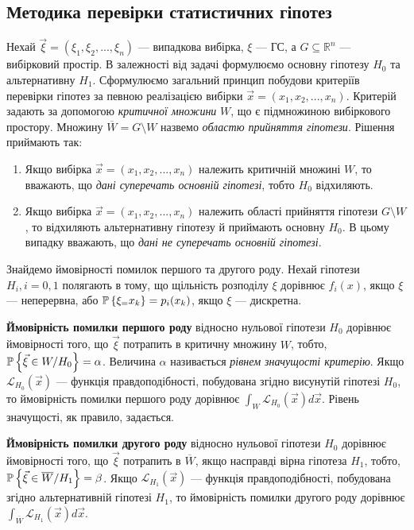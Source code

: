 \subsection{Методика перевірки статистичних гіпотез}
Нехай $\vec{\xi} = \left(\xi_1, \xi_2 ,..., \xi_n\right)$ --- випадкова вибірка, $\xi$ --- ГС, а $G\subseteq \mathbb{R}^n$ --- вибірковий простір.
В залежності від задачі формулюємо основну гіпотезу $H_0$ та альтернативну $H_1$. Сформулюємо загальний принцип побудови 
критеріїв перевірки гіпотез за певною реалізацією вибірки $\vec{x} = \left(x_1, x_2, ..., x_n\right)$.
Критерій задають за допомогою \emph{критичної множини} $W$, що є підмножиною вибіркового простору.
Множину $\overline{W} = G\setminus W$ назвемо \emph{областю прийняття гіпотези}. Рішення приймають так:
\begin{enumerate}
    \item Якщо вибірка $\vec{x} = \left(x_1, x_2, ..., x_n\right)$ належить критичній множині $W$, то вважають, що \emph{дані суперечать основній гіпотезі}, тобто $H_0$ відхиляють.
    \item Якщо вибірка $\vec{x} = \left(x_1, x_2, ..., x_n\right)$ належить області прийняття гіпотези $G\setminus W$, то відхиляють альтернативну гіпотезу й приймають основну $H_0$. В цьому
    випадку вважають, що \emph{дані не суперечать основній гіпотезі}.
\end{enumerate}

Знайдемо ймовірності помилок першого та другого роду. Нехай гіпотези $H_i, i = 0, 1$ полягають в тому, що щільність розподілу $\xi$ дорівнює $f_i(x)$,
якщо $\xi$ --- неперервна, або $\P\left\{ \xi_ = x_k\right\} = p_i(x_k)$, якщо $\xi$ --- дискретна.

\textbf{Ймовірність помилки першого роду} відносно нульової гіпотези $H_0$ дорівнює ймовірності того, що $\vec{\xi}$ потрапить в критичну множину $W$, тобто,
$\P\left\{ \vec{\xi} \in W / H_0\right\} = \alpha$. Величина $\alpha$ називається \emph{рівнем значущості критерію}. Якщо 
$\mathcal{L}_{H_0}(\vec{x})$ --- функція правдоподібності, побудована згідно висунутій гіпотезі $H_0$, то ймовірність помилки першого роду дорівнює
$\int_W \mathcal{L}_{H_0}(\vec{x}) d\vec{x}$. Рівень значущості, як правило, задається.

\textbf{Ймовірність помилки другого роду} відносно нульової гіпотези $H_0$ дорівнює ймовірності того, що $\vec{\xi}$ потрапить в $\overline{W}$,
якщо насправді вірна гіпотеза $H_1$, тобто, $\P\left\{ \vec{\xi} \in \overline{W} / H_1\right\} = \beta$. Якщо 
$\mathcal{L}_{H_1}(\vec{x})$ --- функція правдоподібності, побудована згідно альтернативній гіпотезі $H_1$, то ймовірність помилки другого роду дорівнює
$\int_{\overline{W}} \mathcal{L}_{H_1}(\vec{x}) d\vec{x}$.

